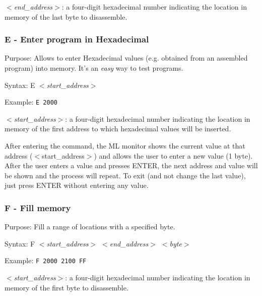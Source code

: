         \hspace{1cm}\textit{$<$end\_address$>$}: a four-digit hexadecimal
        number indicating the location in memory of the last byte to
        disassemble.

        \subsubsection{E - Enter program in Hexadecimal}

        Purpose:  Allows to enter Hexadecimal values (e.g. obtained from an
        assembled program) into memory. It's an \textit{easy} way to test
        programs.

        Syntax: E \textit{$<$start\_address$>$}

        Example: \texttt{E 2000}

        \hspace{1cm}\textit{$<$start\_address$>$}: a four-digit hexadecimal
        number indicating the location in memory of the first address to which
        hexadecimal values will be inserted.

        After entering the command, the ML monitor shows the current value at
        that address ($<$start\_address$>$) and allows the user to enter a new
        value (1 byte). After the user enters a value and presses ENTER, the
        next address and value will be shown and the process will repeat.
        To exit (and not change the last value), just press ENTER without
        entering any value.

        \subsubsection{F - Fill memory}

        Purpose: Fill a range of locations with a specified byte.

        Syntax: F \textit{$<$start\_address$>$ $<$end\_address$>$ $<$byte$>$}

        Example: \texttt{F 2000 2100 FF}

        \hspace{1cm}\textit{$<$start\_address$>$}: a four-digit hexadecimal
        number indicating the location in memory of the first byte to
        disassemble.

